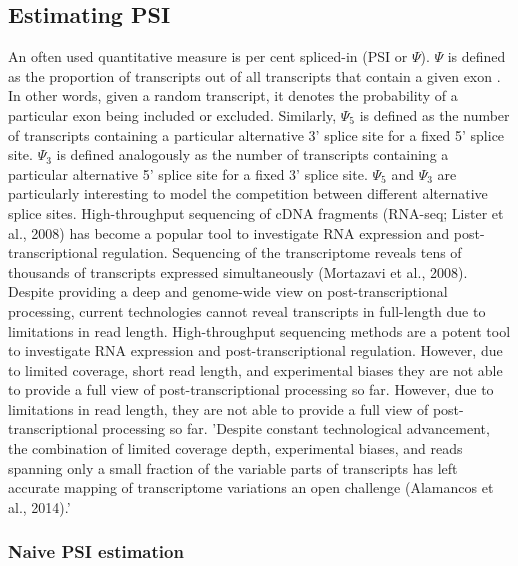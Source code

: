 \subsection{Estimating PSI} \label{subsec:psiestimation}
An often used quantitative measure is per cent spliced-in (PSI or $\Psi$).
$\Psi$ is defined as the proportion of transcripts out of all transcripts that contain a given exon \cite{psi}. In other words, given a random transcript, it denotes the probability of a particular exon being included or excluded.
Similarly, $\Psi_5$ is defined as the number of transcripts containing a particular alternative 3' splice site for a fixed 5' splice site. $\Psi_3$ is defined analogously as the number of transcripts containing a particular alternative 5' splice site for a fixed 3' splice site. $\Psi_5$ and $\Psi_3$ are particularly interesting to model the competition between different alternative splice sites.
High-throughput sequencing of cDNA fragments (RNA-seq; Lister et al., 2008) has become a popular tool to investigate RNA expression and post-transcriptional regulation. Sequencing of the transcriptome reveals tens of thousands of transcripts expressed simultaneously (Mortazavi et al., 2008). Despite providing a deep and genome-wide view on post-transcriptional processing, current technologies cannot reveal transcripts in full-length due to limitations in read length. %
High-throughput sequencing methods are a potent tool to investigate RNA expression and post-transcriptional regulation. However, due to limited coverage, short read length, and experimental biases they are not able to provide a full view of post-transcriptional processing so far.
However, due to limitations in read length, they are not able to provide a full view of post-transcriptional processing so far.
'Despite constant technological advancement, the combination of limited coverage depth, experimental biases, and reads spanning only a small fraction of the variable parts of transcripts has left accurate mapping of transcriptome variations an open challenge (Alamancos et al., 2014).'
\subsubsection{Naive PSI estimation}\label{subsubsec:naivepsi}


